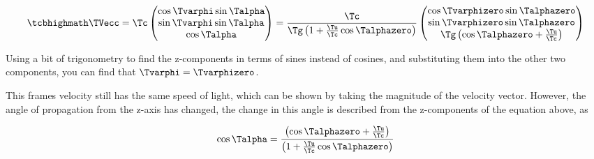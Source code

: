 \begin{equation}
	\label{eq: velocity transform for light}
	\mhl{
		\TVecc  = \Tc
		\begin{pmatrix}
			\cos\Tvarphi \sin\Talpha  \\
			\sin\Tvarphi \sin\Talpha  \\
			\cos\Talpha             \\
		\end{pmatrix}
		=
		\dfrac{\Tc }{ {\Tg }\left(1+\frac{\Tu }{\Tc } \cos\Talphazero \right)}
		\begin{pmatrix}
			\cos\Tvarphizero \sin\Talphazero                         \\
			\sin\Tvarphizero \sin\Talphazero                         \\
			{\Tg } \left( \cos\Talphazero +\frac{\Tu }{\Tc } \right) \\
		\end{pmatrix}
	}
\end{equation}

Using a bit of trigonometry to find the z-components in terms of sines instead of cosines, and substituting them into the other two components, you can find that $\Tvarphi =\Tvarphizero $.



This frames velocity still has the same speed of light, which can be shown by taking the magnitude of the velocity vector.
However, the angle of propagation from the z-axis has changed, the change in this angle is described from the z-components of the equation above, as

\begin{equation}
	\label{eq: cosine transform}
	\cos\Talpha  = \dfrac{\left( \cos\Talphazero +\frac{\Tu }{\Tc } \right)}{\left(1+\frac{\Tu }{\Tc } \cos\Talphazero \right)}
\end{equation}

